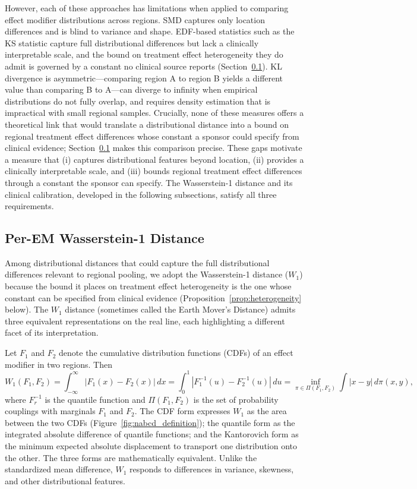 \documentclass[AMA,Times1COL]{WileyNJDv5}
\begin{document}
However, each of these approaches has limitations when applied to comparing effect modifier distributions across regions. SMD captures only location differences and is blind to variance and shape. EDF-based statistics such as the KS statistic capture full distributional differences but lack a clinically interpretable scale, and the bound on treatment effect heterogeneity they do admit is governed by a constant no clinical source reports (Section~\ref{sec:nabcd_metric}). KL divergence is asymmetric---comparing region A to region B yields a different value than comparing B to A---can diverge to infinity when empirical distributions do not fully overlap, and requires density estimation that is impractical with small regional samples. Crucially, none of these measures offers a theoretical link that would translate a distributional distance into a bound on regional treatment effect differences whose constant a sponsor could specify from clinical evidence; Section~\ref{sec:nabcd_metric} makes this comparison precise. These gaps motivate a measure that (i) captures distributional features beyond location, (ii) provides a clinically interpretable scale, and (iii) bounds regional treatment effect differences through a constant the sponsor can specify. The Wasserstein-1 distance and its clinical calibration, developed in the following subsections, satisfy all three requirements.

\subsection{Per-EM Wasserstein-1 Distance}\label{sec:nabcd_metric}

Among distributional distances that could capture the full distributional differences relevant to regional pooling, we adopt the Wasserstein-1 distance ($W_1$) because the bound it places on treatment effect heterogeneity is the one whose constant can be specified from clinical evidence (Proposition~\ref{prop:heterogeneity} below). The $W_1$ distance (sometimes called the Earth Mover's Distance) admits three equivalent representations on the real line, each highlighting a different facet of its interpretation.\cite{villani2009,vallender1974}

Let $F_1$ and $F_2$ denote the cumulative distribution functions (CDFs) of an effect modifier in two regions. Then
\begin{equation}
W_1(F_1, F_2) = \int_{-\infty}^{\infty} |F_1(x) - F_2(x)| \, dx = \int_0^1 |F_1^{-1}(u) - F_2^{-1}(u)| \, du = \inf_{\pi \in \Pi(F_1, F_2)} \int |x - y| \, d\pi(x, y),
\label{eq:wasserstein}
\end{equation}
where $F_r^{-1}$ is the quantile function and $\Pi(F_1, F_2)$ is the set of probability couplings with marginals $F_1$ and $F_2$. The CDF form expresses $W_1$ as the area between the two CDFs (Figure~\ref{fig:nabcd_definition}); the quantile form as the integrated absolute difference of quantile functions; and the Kantorovich form as the minimum expected absolute displacement to transport one distribution onto the other. The three forms are mathematically equivalent.\cite{vallender1974} Unlike the standardized mean difference, $W_1$ responds to differences in variance, skewness, and other distributional features.\cite{panaretos2019}
\end{document}
